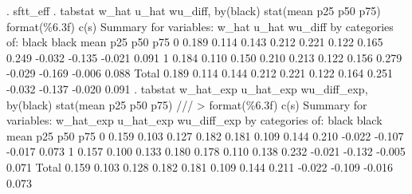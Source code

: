 . sftt_eff
{\smallskip}
. tabstat w_hat u_hat wu_diff, by(black) stat(mean p25 p50 p75) format(\%6.3f) c(s)
{\smallskip}
Summary for variables: w_hat u_hat wu_diff
     by categories of: black 
{\smallskip}
   black {\VBAR}      mean       p25       p50       p75
       0 {\VBAR}     0.189     0.114     0.143     0.212
         {\VBAR}     0.221     0.122     0.165     0.249
         {\VBAR}    -0.032    -0.135    -0.021     0.091
       1 {\VBAR}     0.184     0.110     0.150     0.210
         {\VBAR}     0.213     0.122     0.156     0.279
         {\VBAR}    -0.029    -0.169    -0.006     0.088
   Total {\VBAR}     0.189     0.114     0.144     0.212
         {\VBAR}     0.221     0.122     0.164     0.251
         {\VBAR}    -0.032    -0.137    -0.020     0.091
{\smallskip}
. tabstat w_hat_exp u_hat_exp wu_diff_exp, by(black) stat(mean p25 p50 p75) ///
>         format(\%6.3f) c(s)
{\smallskip}
Summary for variables: w_hat_exp u_hat_exp wu_diff_exp
     by categories of: black 
{\smallskip}
   black {\VBAR}      mean       p25       p50       p75
       0 {\VBAR}     0.159     0.103     0.127     0.182
         {\VBAR}     0.181     0.109     0.144     0.210
         {\VBAR}    -0.022    -0.107    -0.017     0.073
       1 {\VBAR}     0.157     0.100     0.133     0.180
         {\VBAR}     0.178     0.110     0.138     0.232
         {\VBAR}    -0.021    -0.132    -0.005     0.071
   Total {\VBAR}     0.159     0.103     0.128     0.182
         {\VBAR}     0.181     0.109     0.144     0.211
         {\VBAR}    -0.022    -0.109    -0.016     0.073
